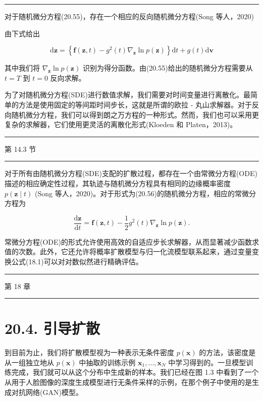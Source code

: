 \documentclass[10pt]{report}
\newcommand{\HRule}{\begin{center}\rule{0.9\linewidth}{0.2mm}\end{center}}
\begin{document}
\HRule

对于随机微分方程(20.55)，存在一个相应的反向随机微分方程(Song 等人，2020)

由下式给出

\[
\mathrm{d}\mathbf{z} = \left\{  {\mathbf{f}\left( {\mathbf{z},t}\right)  - {g}^{2}\left( t\right) {\nabla }_{\mathbf{z}}\ln p\left( \mathbf{z}\right) }\right\}  \mathrm{d}t + g\left( t\right) \mathrm{d}\mathbf{v} \tag{20.56}
\]

其中我们将 \({\nabla }_{\mathbf{z}}\ln p\left( \mathbf{z}\right)\) 识别为得分函数。由(20.55)给出的随机微分方程需要从 \(t = T\) 到 \(t = 0\) 反向求解。

为了对随机微分方程(SDE)进行数值求解，我们需要对时间变量进行离散化。最简单的方法是使用固定的等间距时间步长，这就是所谓的欧拉 - 丸山求解器。对于反向随机微分方程，我们可以得到朗之万方程的一种形式。然而，我们也可以采用更复杂的求解器，它们使用更灵活的离散化形式(Kloeden 和 Platen，2013)。

\HRule

第 14.3 节

\HRule

对于所有由随机微分方程(SDE)支配的扩散过程，都存在一个由常微分方程(ODE)描述的相应确定性过程，其轨迹与随机微分方程具有相同的边缘概率密度 \(p\left( {\mathbf{z} \mid  t}\right)\) (Song 等人，2020)。对于形式为(20.56)的随机微分方程，相应的常微分方程为

\[
\frac{\mathrm{d}\mathbf{z}}{\mathrm{d}t} = \mathbf{f}\left( {\mathbf{z},t}\right)  - \frac{1}{2}{g}^{2}\left( t\right) {\nabla }_{\mathbf{z}}\ln p\left( \mathbf{z}\right) . \tag{20.57}
\]

常微分方程(ODE)的形式允许使用高效的自适应步长求解器，从而显著减少函数求值的次数。此外，它还允许将概率扩散模型与归一化流模型联系起来，通过变量变换公式(18.1)可以对对数似然进行精确评估。

\HRule

第 18 章

\HRule

\section*{20.4. 引导扩散}

到目前为止，我们将扩散模型视为一种表示无条件密度 \(p\left( \mathbf{x}\right)\) 的方法，该密度是从一组独立地从 \(p\left( \mathbf{x}\right)\) 中抽取的训练示例 \({\mathbf{x}}_{1},\ldots ,{\mathbf{x}}_{N}\) 中学习得到的。一旦模型训练完成，我们就可以从这个分布中生成新的样本。我们已经在图 1.3 中看到了一个从用于人脸图像的深度生成模型进行无条件采样的示例，在那个例子中使用的是生成对抗网络(GAN)模型。
\end{document}
